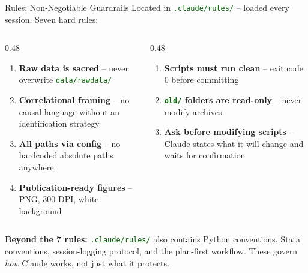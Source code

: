 \documentclass[aspectratio=169,11pt,dvipsnames]{beamer}
\newcommand{\file}[1]{\textcolor{darkgreen}{\nolinkurl{#1}}}
\begin{document}
\begin{frame}{Rules: Non-Negotiable Guardrails}
  Located in \file{.claude/rules/} -- loaded every session. Seven hard rules:

  \begin{columns}[T]
    \begin{column}{0.48\textwidth}
      \begin{enumerate}\setlength\itemsep{4pt}
        \item \textbf{Raw data is sacred} -- never overwrite \file{data/rawdata/}
        \item \textbf{Correlational framing} -- no causal language without an identification strategy
        \item \textbf{All paths via config} -- no hardcoded absolute paths anywhere
        \item \textbf{Publication-ready figures} -- PNG, 300 DPI, white background
      \end{enumerate}
    \end{column}
    \begin{column}{0.48\textwidth}
      \begin{enumerate}\setlength\itemsep{4pt}
        \setcounter{enumi}{4}
        \item \textbf{Scripts must run clean} -- exit code 0 before committing
        \item \textbf{\file{old/} folders are read-only} -- never modify archives
        \item \textbf{Ask before modifying scripts} -- Claude states what it will change and waits for confirmation
      \end{enumerate}
    \end{column}
  \end{columns}
  \vspace{0.3cm}
  \begin{greenbox}
    \small \textbf{Beyond the 7 rules:} \file{.claude/rules/} also contains
    Python conventions, Stata conventions, session-logging protocol,
    and the plan-first workflow. These govern \emph{how} Claude works,
    not just what it protects.
  \end{greenbox}
\end{frame}
\end{document}
